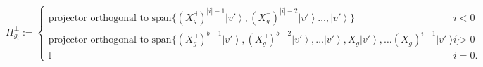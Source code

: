 \documentclass{theoretics}
\begin{document}
\begin{proposition}
\begin{footnotesize}
\begin{displaymath}
      \Pi_{g_{i}}^{\perp}:=\begin{cases}
        \text{projector orthogonal to }\text{span}\{(X_{g}^{\dashv})^{|i|-1}\left|v'\right\rangle ,(X_{g}^{\dashv})^{|i|-2}\left|v'\right\rangle \dots,\left|v'\right\rangle \}                                                                  & i<0  \\
        \text{projector orthogonal to }\text{span}\{(X_{g}^{\dashv})^{b-1}\left|v'\right\rangle ,(X_{g}^{\dashv})^{b-2}\left|v'\right\rangle ,\dots\left|v'\right\rangle ,X_{g}\left|v'\right\rangle ,\dots(X_{g})^{i-1}\left|v'\right\rangle \} & i>0  \\
        \mathbb{I}                                                                                                                                                                                                                               & i=0.
      \end{cases}
    \end{displaymath}
  \end{footnotesize}
\end{proposition}
\end{document}
